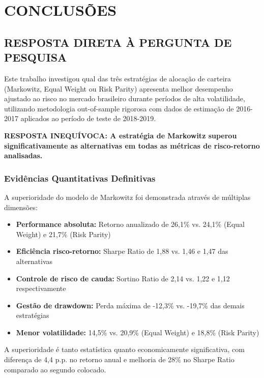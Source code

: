 
\chapter{CONCLUSÕES}

\section{RESPOSTA DIRETA À PERGUNTA DE PESQUISA}

Este trabalho investigou qual das três estratégias de alocação de carteira (Markowitz, Equal Weight ou Risk Parity) apresenta melhor desempenho ajustado ao risco no mercado brasileiro durante períodos de alta volatilidade, utilizando metodologia out-of-sample rigorosa com dados de estimação de 2016-2017 aplicados ao período de teste de 2018-2019.

\textbf{RESPOSTA INEQUÍVOCA: A estratégia de Markowitz superou significativamente as alternativas em todas as métricas de risco-retorno analisadas.}

\subsection{Evidências Quantitativas Definitivas}

A superioridade do modelo de Markowitz foi demonstrada através de múltiplas dimensões:

\begin{itemize}
    \item \textbf{Performance absoluta:} Retorno anualizado de 26,1\% vs. 24,1\% (Equal Weight) e 21,7\% (Risk Parity)
    \item \textbf{Eficiência risco-retorno:} Sharpe Ratio de 1,88 vs. 1,46 e 1,47 das alternativas
    \item \textbf{Controle de risco de cauda:} Sortino Ratio de 2,14 vs. 1,22 e 1,12 respectivamente
    \item \textbf{Gestão de drawdown:} Perda máxima de -12,3\% vs. -19,7\% das demais estratégias
    \item \textbf{Menor volatilidade:} 14,5\% vs. 20,9\% (Equal Weight) e 18,8\% (Risk Parity)
\end{itemize}

A superioridade é tanto estatística quanto economicamente significativa, com diferença de 4,4 p.p. no retorno anual e melhoria de 28\% no Sharpe Ratio comparado ao segundo colocado.

